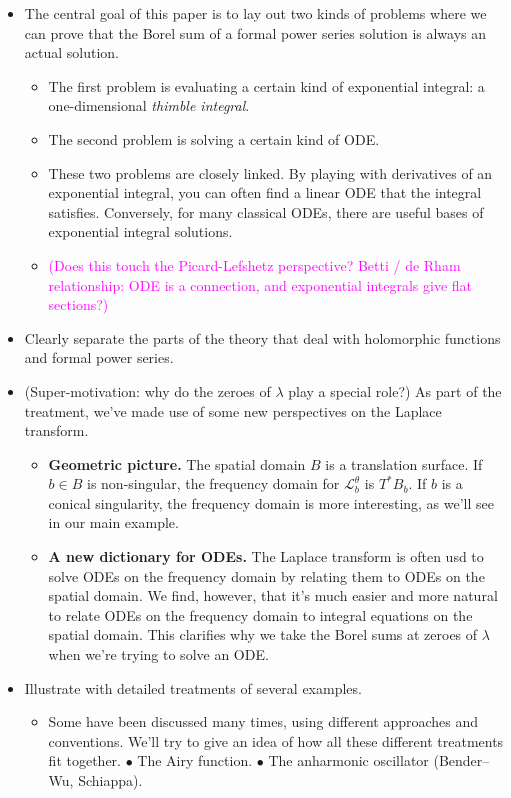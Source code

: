 \documentclass{article}
\newcommand{\laplace}{\mathcal{L}}
\begin{document}
\begin{itemize}
\item The central goal of this paper is to lay out two kinds of problems where we can prove that the Borel sum of a formal power series solution is always an actual solution.
\begin{itemize}
\item The first problem is evaluating a certain kind of exponential integral: a one-dimensional {\em thimble integral}.
\item The second problem is solving a certain kind of ODE.
\item These two problems are closely linked. By playing with derivatives of an exponential integral, you can often find a linear ODE that the integral satisfies. Conversely, for many classical ODEs, there are useful bases of exponential integral solutions.
\item \textcolor{magenta}{(Does this touch the Picard-Lefshetz perspective? Betti / de Rham relationship: ODE is a connection, and exponential integrals give flat sections?)}
\end{itemize}
\item Clearly separate the parts of the theory that deal with holomorphic functions and formal power series.
\item (Super-motivation: why do the zeroes of $\lambda$ play a special role?) As part of the treatment, we've made use of some new perspectives on the Laplace transform.
\begin{itemize}
\item \textbf{Geometric picture.} The spatial domain $B$ is a translation surface. If $b \in B$ is non-singular, the frequency domain for $\laplace_b^\theta$ is $T^* B_b$. If $b$ is a conical singularity, the frequency domain is more interesting, as we'll see in our main example.
\item \textbf{A new dictionary for ODEs.} The Laplace transform is often usd to solve ODEs on the frequency domain by relating them to ODEs on the spatial domain. We find, however, that it's much easier and more natural to relate ODEs on the frequency domain to integral equations on the spatial domain. This clarifies why we take the Borel sums at zeroes of $\lambda$ when we're trying to solve an ODE.
\end{itemize}
\item Illustrate with detailed treatments of several examples.
\begin{itemize}
\item Some have been discussed many times, using different approaches and conventions. We'll try to give an idea of how all these different treatments fit together. $\bullet$ The Airy function. $\bullet$ The anharmonic oscillator (Bender--Wu, Schiappa).

\end{itemize}
\end{itemize}
\end{document}
